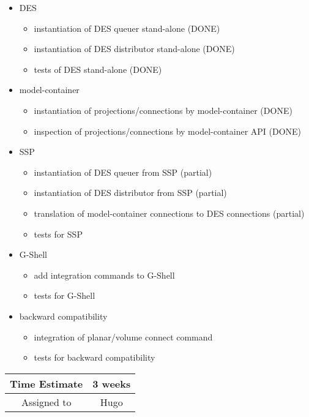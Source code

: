 \documentclass[12pt]{article}
\begin{document}
\begin{itemize}
\item DES
  \begin{itemize}
  \item instantiation of DES queuer stand-alone (DONE)
  \item instantiation of DES distributor stand-alone (DONE)
  \item tests of DES stand-alone (DONE)
  \end{itemize}
\item model-container
  \begin{itemize}
  \item instantiation of projections/connections by model-container (DONE)
  \item inspection of projections/connections by model-container API (DONE)
  \end{itemize}
\item SSP
  \begin{itemize}
  \item instantiation of DES queuer from SSP (partial)
  \item instantiation of DES distributor from SSP (partial)
  \item translation of model-container connections to DES connections (partial)
  \item tests for SSP
  \end{itemize}
\item G-Shell
  \begin{itemize}
  \item add integration commands to G-Shell
  \item tests for G-Shell
  \end{itemize}
\item backward compatibility
  \begin{itemize}
  \item integration of planar/volume connect command
  \item tests for backward compatibility
  \end{itemize}
\end{itemize}


\begin{center}
  \vspace{5mm}
  \centering
  \begin{tabular}{|c|c|}
    \hline
    Time Estimate
    & 3 weeks \\
    \hline
    Assigned to
    & Hugo \\
    \hline
  \end{tabular}
\end{center}
\end{document}
